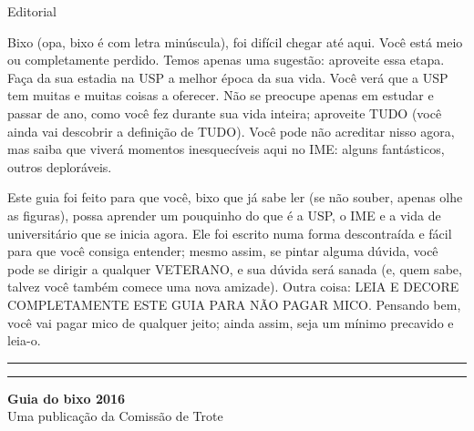 \begin{editorial}{Editorial}

Bixo (opa, bixo é com letra minúscula), foi difícil chegar até aqui. Você está
meio ou completamente perdido. Temos apenas uma sugestão: aproveite essa etapa.
Faça da sua estadia na USP a melhor época da sua vida. Você verá que a USP tem
muitas e muitas coisas a oferecer. Não se preocupe apenas em estudar e passar de
ano, como você fez durante sua vida inteira; aproveite TUDO (você ainda vai
descobrir a definição de TUDO). Você pode não acreditar nisso agora, mas saiba
que viverá momentos inesquecíveis aqui no IME: alguns fantásticos, outros deploráveis.

Este guia foi feito para que você, bixo que já sabe ler (se não souber, apenas olhe
as figuras), possa aprender um pouquinho do que é a USP, o IME e a vida de
universitário que se inicia agora. Ele foi escrito numa forma descontraída e
fácil para que você consiga entender; mesmo assim, se pintar alguma dúvida,
você pode se dirigir a qualquer VETERANO, e sua dúvida será sanada (e, quem sabe,
talvez você também comece uma nova amizade). Outra coisa: LEIA E DECORE
COMPLETAMENTE ESTE GUIA PARA NÃO PAGAR MICO. Pensando bem, você vai pagar mico
de qualquer jeito; ainda assim, seja um mínimo precavido e leia-o.


\rule{\textwidth}{0.5ex}\rule{2ex}{0.5ex}

{\large\bf Guia do bixo 2016} \\
Uma publicação da Comissão de Trote


\end{editorial}
